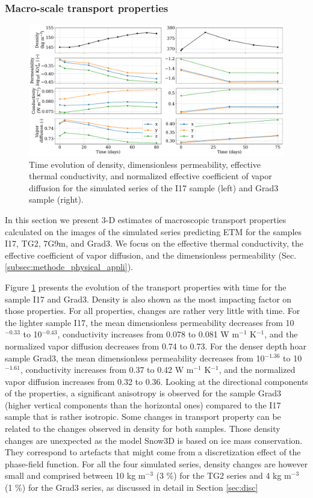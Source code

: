 \documentclass[draft,ms]{agujournal2019}
\begin{document}
\subsubsection{Macro-scale transport properties}

\begin{figure}
    \centering
    \includegraphics[width=\linewidth]{Figures/4images_transport_temps_court.pdf}
    \caption{Time evolution of density, dimensionless permeability, effective thermal conductivity, and normalized effective coefficient of vapor diffusion for the simulated series of the I17 sample (left) and Grad3 sample (right). }
    \label{fig:transport_temps} 
\end{figure}

In this section we present 3-D estimates of macroscopic transport properties calculated on the images of the simulated series predicting ETM for the samples I17, TG2, 7G9m, and Grad3. We focus on the effective thermal conductivity, the effective coefficient of vapor diffusion, and the dimensionless permeability (Sec. \ref{subsec:methode_physical_appli}).


Figure \ref{fig:transport_temps} presents the evolution of the transport properties with time for the sample I17 and Grad3. Density is also shown as the most impacting factor on those properties.
For all properties, changes are rather very little with time.
For the lighter sample I17, the mean dimensionless permeability decreases from 10$^{-0.33}$ to 10$^{-0.43}$, conductivity increases from 0.078 to 0.081 W m$^{-1}$ K$^{-1}$, and the normalized vapor diffusion decreases from 0.74 to 0.73. For the denser depth hoar sample Grad3, the mean dimensionless permeability decreases from 10$^{-1.36}$ to 10$^{-1.61}$, conductivity increases from 0.37 to 0.42 W m$^{-1}$ K$^{-1}$, and the normalized vapor diffusion increases from 0.32 to 0.36. Looking at the directional components of the properties, a significant anisotropy is observed for the sample Grad3 (higher vertical components than the horizontal ones) compared to the I17 sample that is rather isotropic.
Some changes in transport property can be related to the changes observed in density for both samples. Those density changes are unexpected as the model Snow3D is based on ice mass conservation. They correspond to artefacts that might come from a discretization effect of the phase-field function. For all the four simulated series, density changes are however small and comprised between 10 kg m$^{-3}$ (3 \%) for the TG2 series and 4 kg m$^{-3}$ (1 \%) for the Grad3 series, as discussed in detail in Section \ref{sec:disc}
\end{document}
